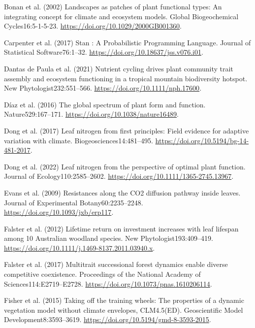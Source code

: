 \documentclass[
  12pt,
  letterpaper,
  DIV=11,
  numbers=noendperiod]{scrartcl}
\newlength{\cslhangindent}
\newenvironment{CSLReferences}[2] %
 {\begin{list}{}{%
  \setlength{\itemindent}{0pt}
  \setlength{\leftmargin}{0pt}
  \setlength{\parsep}{0pt}
  \ifodd #1
   \setlength{\leftmargin}{\cslhangindent}
   \setlength{\itemindent}{-1\cslhangindent}
  \fi
  \setlength{\itemsep}{#2\baselineskip}}}
 {\end{list}}
\begin{document}
\label{refs}
\begin{CSLReferences}{1}{1}
Bonan et al. (2002) Landscapes as patches of plant functional types:
{An} integrating concept for climate and ecosystem models. Global
Biogeochemical Cycles16:5-1-5-23.
\url{https://doi.org/10.1029/2000GB001360}.

Carpenter et al. (2017) Stan : {A Probabilistic Programming Language}.
Journal of Statistical Software76:1--32.
\url{https://doi.org/10.18637/jss.v076.i01}.

Dantas de Paula et al. (2021) Nutrient cycling drives plant community
trait assembly and ecosystem functioning in a tropical mountain
biodiversity hotspot. New Phytologist232:551--566.
\url{https://doi.org/10.1111/nph.17600}.

Díaz et al. (2016) The global spectrum of plant form and function.
Nature529:167--171. \url{https://doi.org/10.1038/nature16489}.

Dong et al. (2017) Leaf nitrogen from first principles: Field evidence
for adaptive variation with climate. Biogeosciences14:481--495.
\url{https://doi.org/10.5194/bg-14-481-2017}.

Dong et al. (2022) Leaf nitrogen from the perspective of optimal plant
function. Journal of Ecology110:2585--2602.
\url{https://doi.org/10.1111/1365-2745.13967}.

Evans et al. (2009) Resistances along the {CO2} diffusion pathway inside
leaves. Journal of Experimental Botany60:2235--2248.
\url{https://doi.org/10.1093/jxb/erp117}.

Falster et al. (2012) Lifetime return on investment increases with leaf
lifespan among 10 {Australian} woodland species. New
Phytologist193:409--419.
\url{https://doi.org/10.1111/j.1469-8137.2011.03940.x}.

Falster et al. (2017) Multitrait successional forest dynamics enable
diverse competitive coexistence. Proceedings of the National Academy of
Sciences114:E2719--E2728. \url{https://doi.org/10.1073/pnas.1610206114}.

Fisher et al. (2015) Taking off the training wheels: The properties of a
dynamic vegetation model without climate envelopes, {CLM4}.5({ED}).
Geoscientific Model Development8:3593--3619.
\url{https://doi.org/10.5194/gmd-8-3593-2015}.


\end{CSLReferences}
\end{document}
